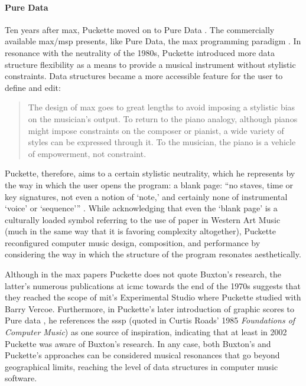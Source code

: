 	\paragraph{Pure Data}
	\label{computer:puredata}

	Ten years after \gls{max}, Puckette moved on to Pure Data \parencite{icmc/bbp2372.1997.060}. The commercially available \gls{max/msp} \parencite{DBLP:conf/icmc/Zicarelli98} presents, like Pure Data, the \gls{max} programming paradigm \parencite{DBLP:journals/comj/Puckette02}. In resonance with the neutrality of the 1980s, Puckette introduced more data structure flexibility as a means to provide a musical instrument without stylistic constraints. Data structures became a more accessible feature for the user to define and edit:

	\begin{quote}
		The design of \gls{max} goes to great lengths to avoid imposing a stylistic bias on the musician's output. To return to the piano analogy, although pianos might impose constraints on the composer or pianist, a wide variety of styles can be expressed through it. To the musician, the piano is a vehicle of empowerment, not constraint. \parencite{DBLP:journals/comj/Puckette02}
	\end{quote}

	Puckette, therefore, aims to a certain stylistic neutrality, which he represents by the way in which the user opens the program: a blank page: ``no staves, time or key signatures, not even a notion of `note,' and certainly none of instrumental `voice' or `sequence''' \parencite{DBLP:journals/comj/Puckette02}. While acknowledging that even the `blank page' is a culturally loaded symbol referring to the use of paper in Western Art Music (much in the same way that it is favoring complexity altogether), Puckette reconfigured computer music design, composition, and performance by considering the way in which the structure of the program resonates aesthetically.

	Although in the \gls{max} papers Puckette does not quote Buxton's research, the latter's numerous publications at \gls{icmc} towards the end of the 1970s suggests that they reached the scope of \gls{mit}'s Experimental Studio where Puckette studied with Barry Vercoe. Furthermore, in Puckette's later introduction of graphic scores to Pure data \parencite{DBLP:conf/icmc/Puckette02} , he references the \gls{sssp} (quoted in Curtis Roads' 1985 \textit{Foundations of Computer Music}) as one source of inspiration, indicating that at least in 2002 Puckette was aware of Buxton's research. In any case, both Buxton's and Puckette's approaches can be considered musical resonances that go beyond geographical limits, reaching the level of data structures in computer music software.

